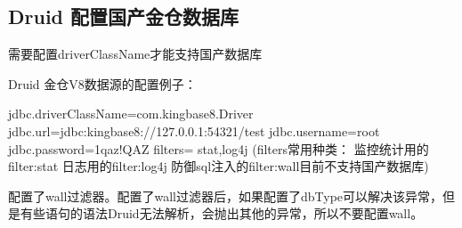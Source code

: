 \documentclass[letterpaper,10pt,english]{sphinxmanual}
\begin{document}
\subsection{Druid 配置国产金仓数据库}
\label{\detokenize{interface/druid:id1}}
需要配置driverClassName才能支持国产数据库

Druid 金仓V8数据源的配置例子：

\begin{sphinxVerbatim}[commandchars=\\\{\}]
jdbc.driverClassName=com.kingbase8.Driver
jdbc.url=jdbc:kingbase8://127.0.0.1:54321/test
jdbc.username=root
jdbc.password=1qaz!QAZ
filters= stat,log4j
(filters常用种类：
监控统计用的filter:stat
日志用的filter:log4j
防御sql注入的filter:wall目前不支持国产数据库)
\end{sphinxVerbatim}

配置了wall过滤器。配置了wall过滤器后，如果配置了dbType可以解决该异常，但是有些语句的语法Druid无法解析，会抛出其他的异常，所以不要配置wall。
\end{document}
